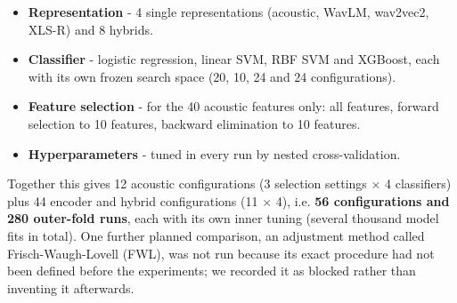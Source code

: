 \documentclass[11pt,a4paper]{article}
\begin{document}
\begin{itemize}\item \textbf{Representation} - 4 single representations (acoustic, WavLM, wav2vec2, XLS-R) and 8 hybrids.
\item \textbf{Classifier} - logistic regression, linear SVM, RBF SVM and XGBoost, each with its own frozen search space (20, 10, 24 and 24 configurations).
\item \textbf{Feature selection} - for the 40 acoustic features only: all features, forward selection to 10 features, backward elimination to 10 features.
\item \textbf{Hyperparameters} - tuned in every run by nested cross-validation.
\end{itemize}
Together this gives 12 acoustic configurations (3 selection settings $\times$ 4 classifiers) plus 44 encoder and hybrid configurations (11 $\times$ 4), i.e. \textbf{56 configurations and 280 outer-fold runs}, each with its own inner tuning (several thousand model fits in total). One further planned comparison, an adjustment method called Frisch-Waugh-Lovell (FWL), was not run because its exact procedure had not been defined before the experiments; we recorded it as blocked rather than inventing it afterwards.
\end{document}
